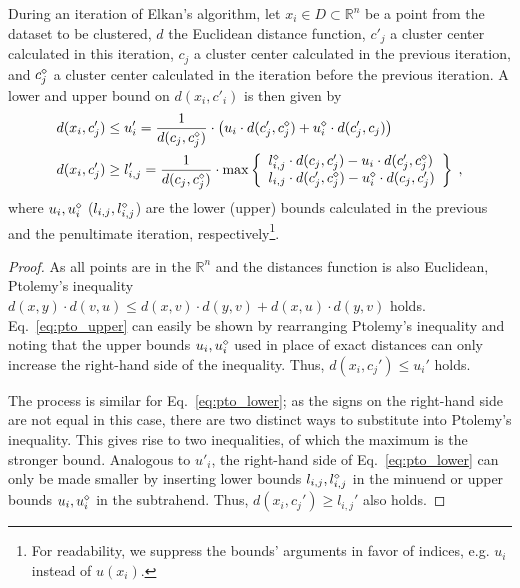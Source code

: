 \begin{theorem}
	During an iteration of Elkan's algorithm,
	let $x_i \in D \subset \mathbb{R}^n$ be a point from the dataset to be clustered,
	$d$ the Euclidean distance function,
	$c'_j$ a cluster center calculated in this iteration,
	$c_j$ a cluster center calculated in the previous iteration, and
	$c^\diamond_j$ a cluster center calculated in the iteration before the previous iteration.
	A lower and upper bound on $d(x_i,c'_i)$ is then given by
	\begin{align}
		\label{eq:pto_upper}
		d(x_i, c_j') & \leq u_i' = \frac{1}{d(c_j, c_j^{\diamond})} \cdot \left( u_i \cdot d(c_j', c_j^{\diamond}) + u_i^{\diamond} \cdot d(c_j', c_j) \right) \\
		\label{eq:pto_lower}
		d(x_i, c_j') & \geq l_{i,j}' = \frac{1}{d(c_j, c_j^{\diamond})} \cdot \max \left\{
		\begin{array}{l}
			l_{i,j}^{\diamond} \cdot d(c_j, c_j') - u_i \cdot d(c_j', c_j^{\diamond}) \\
			l_{i,j} \cdot d(c_j', c_j^{\diamond}) - u_i^{\diamond} \cdot d(c_j, c_j')
		\end{array}
		\right\}\;,
	\end{align}
	where $u_i, u^\diamond_i$ ($l_{i,j}, l^\diamond_{i,j}$) are the lower (upper) bounds calculated in the previous and the penultimate iteration, respectively\footnote{
 For readability, we suppress the bounds' arguments in favor of indices, e.g. $u_i$ instead of $u(x_i)$.
    }.
\end{theorem}
\vspace{-2\baselineskip}
\begin{proof}
	As all points are in the $\mathbb{R}^n$ and the distances function is also Euclidean, Ptolemy's inequality
	$d(x, y)\cdot d(v, u) \leq d(x, v) \cdot d(y,v) + d(x, u) \cdot d(y, v)$ holds.
	Eq.~\ref{eq:pto_upper} can easily be shown by rearranging Ptolemy's inequality and
	noting that the upper bounds $u_i, u^\diamond_i$ used in place of exact distances can only increase the right-hand side of the inequality. Thus, $d(x_i, c_j') \leq u_i'$ holds.

	The process is similar for Eq.~\ref{eq:pto_lower}; as the signs on the right-hand side are not equal in this case, there are two distinct ways to substitute into Ptolemy's inequality.
	This gives rise to two inequalities, of which the maximum is the stronger bound.
	Analogous to $u'_i$, the right-hand side of Eq.~\ref{eq:pto_lower} can only be made smaller by inserting lower bounds $l_{i,j},l_{i,j}^\diamond$ in the minuend or upper bounds $u_i, u^\diamond_i$ in the subtrahend.
	Thus, $d(x_i, c_j') \geq l_{i,j}'$ also holds.
\end{proof}


